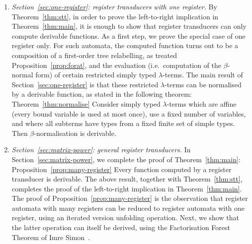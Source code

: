 \begin{enumerate}
     \item \emph{Section~\ref{sec:one-register}: register transducers with one register.} By Theorem~\ref{thm:stt}, in order to prove the left-to-right implication in Theorem~\ref{thm:main}, it is enough to show that register transducers can only compute  derivable  functions. As a first step, we prove the special case of one register only. For such automata, the computed function turns out to be a composition of a first-order tree relabelling, as treated  Proposition~\ref{prop:forat}, and the evaluation (i.e.~computation of the $\beta$-normal form) of certain restricted   simply typed $\lambda$-terms. The main result of Section~\ref{sec:one-register} is that these restricted $\lambda$-terms can be normalised by a derivable function, as stated in the following theorem:
    \announce
    {Theorem~\ref{thm:normalise}}
    {Consider  simply typed $\lambda$-terms which are affine (every bound variable is used at most once), use  a fixed number of variables, and where all subterms have types from a fixed finite set of simple types. Then $\beta$-normalisation is derivable. }
    

    \item \emph{Section~\ref{sec:matrix-power}: general register transducers.}  In Section~\ref{sec:matrix-power}, we complete the proof of Theorem~\ref{thm:main}:
    \announce
    {Proposition~\ref{prop:many-register}}
    {Every function computed by a register transducer is derivable.}
    The above result, together with Theorem~\ref{thm:stt}, completes the proof of the left-to-right implication in Theorem~\ref{thm:main}. The proof of Proposition~\ref{prop:many-register} is the observation that register automata with many registers can be reduced to register automata with one register, using an iterated version unfolding operation. Next, we show that the latter operation can itself be derived, using  the Factorisation Forest Theorem of Imre Simon~\cite{simon_factorization_1990}.
\end{enumerate}
